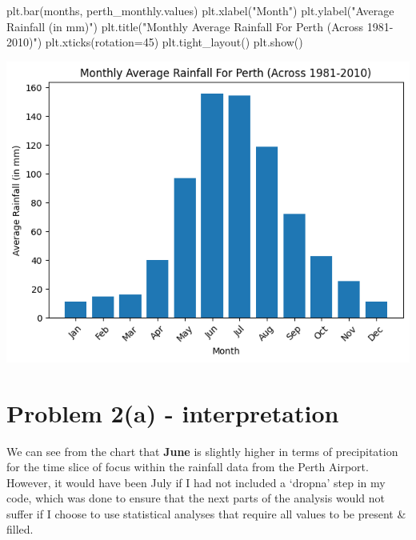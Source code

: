 \documentclass[
  letterpaper,
  DIV=11,
  numbers=noendperiod]{scrartcl}
\newenvironment{Shaded}{\begin{snugshade}}{\end{snugshade}}
\newcommand{\DecValTok}[1]{\textcolor[rgb]{0.68,0.00,0.00}{#1}}
\newcommand{\NormalTok}[1]{\textcolor[rgb]{0.00,0.23,0.31}{#1}}
\newcommand{\OperatorTok}[1]{\textcolor[rgb]{0.37,0.37,0.37}{#1}}
\newcommand{\StringTok}[1]{\textcolor[rgb]{0.13,0.47,0.30}{#1}}
\begin{document}
\begin{Shaded}
\begin{Highlighting}[]
\NormalTok{plt.bar(months, perth\_monthly.values)}
\NormalTok{plt.xlabel(}\StringTok{"Month"}\NormalTok{)}
\NormalTok{plt.ylabel(}\StringTok{"Average Rainfall (in mm)"}\NormalTok{)}
\NormalTok{plt.title(}\StringTok{"Monthly Average Rainfall For Perth (Across 1981{-}2010)"}\NormalTok{)}
\NormalTok{plt.xticks(rotation}\OperatorTok{=}\DecValTok{45}\NormalTok{)}
\NormalTok{plt.tight\_layout()}
\NormalTok{plt.show()}
\end{Highlighting}
\end{Shaded}

\includegraphics{Assignment-1_ICP_files/figure-pdf/cell-3-output-1.png}

\section{Problem 2(a) -
interpretation}\label{problem-2a---interpretation}

We can see from the chart that \textbf{June} is slightly higher in terms
of precipitation for the time slice of focus within the rainfall data
from the Perth Airport. However, it would have been July if I had not
included a `dropna' step in my code, which was done to ensure that the
next parts of the analysis would not suffer if I choose to use
statistical analyses that require all values to be present \& filled.
\end{document}
